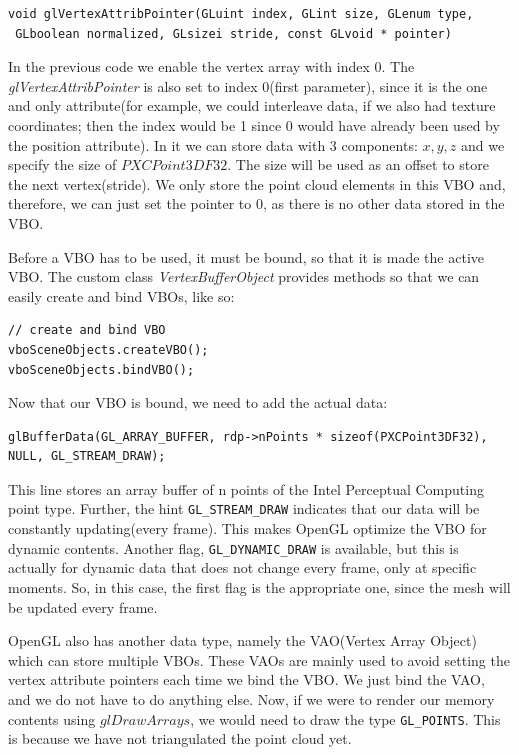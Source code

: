 \documentclass[]{article}
\begin{document}
\begin{verbatim}
void glVertexAttribPointer(GLuint index​, GLint size​, GLenum type,
 GLboolean normalized​, GLsizei stride​, const GLvoid * pointer​)
\end{verbatim}

In the previous code we enable the vertex array with index 0. The \textit{glVertexAttribPointer} is also set to  index 0(first parameter), since it is the one and only attribute(for example, we could interleave data, if we also had texture coordinates; then the index would be 1 since 0 would have already been used by the position attribute). In it we can store data with 3 components: $x,y,z$ and we specify the size of $PXCPoint3DF32$. The size will be used as an offset to store the next vertex(stride). We only store the point cloud elements in this VBO and, therefore, we can just set the pointer to 0, as there is no other data stored in the VBO.

Before a VBO has to be used, it must be bound, so that it is made the active VBO. The custom class \textit{VertexBufferObject} provides methods so that we can easily create and bind VBOs, like so:
\begin{verbatim}
// create and bind VBO
vboSceneObjects.createVBO();
vboSceneObjects.bindVBO();
\end{verbatim}

Now that our VBO is bound, we need to add the actual data:

\begin{verbatim}
glBufferData(GL_ARRAY_BUFFER, rdp->nPoints * sizeof(PXCPoint3DF32), 
NULL, GL_STREAM_DRAW);
\end{verbatim}

This line stores an array buffer of n points of the Intel Perceptual Computing point type. Further, the hint \verb|GL_STREAM_DRAW| indicates that our data will be constantly updating(every frame). This makes OpenGL optimize the VBO for dynamic contents. Another flag, \verb|GL_DYNAMIC_DRAW| is available, but this is actually for dynamic data that does not change every frame, only at specific moments. So, in this case, the first flag is the appropriate one, since the mesh will be updated every frame.

OpenGL also has another data type, namely the VAO(Vertex Array Object) which can store multiple VBOs. These VAOs are mainly used to avoid setting the vertex attribute pointers each time we bind the VBO. We just bind the VAO, and we do not have to do anything else. Now, if we were to render our memory contents using $glDrawArrays$, we would need to draw the type \verb|GL_POINTS|. This is because we have not triangulated the point cloud yet.
\end{document}
